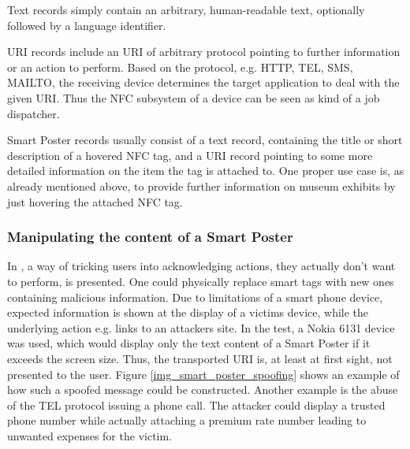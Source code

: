 \documentclass[12pt,a4paper]{article}
\begin{document}
Text records simply contain an arbitrary, human-readable text, optionally followed by a language identifier.

URI records include an URI of arbitrary protocol pointing to further information or an action to perform. Based on the protocol, e.g. HTTP, TEL, SMS, MAILTO, the receiving device determines the target application to deal with the given URI. Thus the NFC subsystem of a device can be seen as kind of a job dispatcher.

Smart Poster records usually consist of a text record, containing the title or short description of a hovered NFC tag, and a URI record pointing to some more detailed information on the item the tag is attached to. One proper use case is, as already mentioned above, to provide further information on museum exhibits by just hovering the attached NFC tag.

\subsubsection{Manipulating the content of a Smart Poster}

In \cite{DBLP:conf/IEEEares/Mulliner09}, a way of tricking users into acknowledging actions, they actually don't want to perform, is presented. One could physically replace smart tags with new ones containing malicious information. Due to limitations of a smart phone device, expected information is shown at the display of a victims device, while the underlying action e.g. links to an attackers site. In the test, a Nokia 6131 device was used, which would display only the text content of a Smart Poster if it exceeds the screen size. Thus, the transported URI is, at least at first sight, not presented to the user. Figure \ref{img_smart_poster_spoofing} shows an example of how such a spoofed message could be constructed. Another example is the abuse of the TEL protocol issuing a phone call. The attacker could display a trusted phone number while actually attaching a premium rate number leading to unwanted expenses for the victim.
\end{document}
